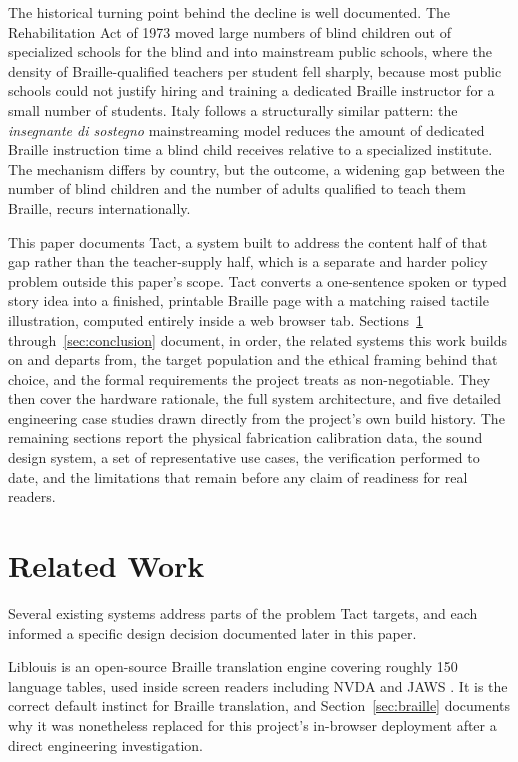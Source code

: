 \documentclass[conference]{IEEEtran}
\begin{document}
The historical turning point behind the decline is well documented. The Rehabilitation Act of 1973 moved large numbers of blind children out of specialized schools for the blind and into mainstream public schools, where the density of Braille-qualified teachers per student fell sharply, because most public schools could not justify hiring and training a dedicated Braille instructor for a small number of students. Italy follows a structurally similar pattern: the \emph{insegnante di sostegno} mainstreaming model reduces the amount of dedicated Braille instruction time a blind child receives relative to a specialized institute. The mechanism differs by country, but the outcome, a widening gap between the number of blind children and the number of adults qualified to teach them Braille, recurs internationally.

This paper documents Tact, a system built to address the content half of that gap rather than the teacher-supply half, which is a separate and harder policy problem outside this paper's scope. Tact converts a one-sentence spoken or typed story idea into a finished, printable Braille page with a matching raised tactile illustration, computed entirely inside a web browser tab. Sections~\ref{sec:related} through~\ref{sec:conclusion} document, in order, the related systems this work builds on and departs from, the target population and the ethical framing behind that choice, and the formal requirements the project treats as non-negotiable. They then cover the hardware rationale, the full system architecture, and five detailed engineering case studies drawn directly from the project's own build history. The remaining sections report the physical fabrication calibration data, the sound design system, a set of representative use cases, the verification performed to date, and the limitations that remain before any claim of readiness for real readers.

\section{Related Work}\label{sec:related}

Several existing systems address parts of the problem Tact targets, and each informed a specific design decision documented later in this paper.

Liblouis is an open-source Braille translation engine covering roughly 150 language tables, used inside screen readers including NVDA and JAWS \cite{liblouis}. It is the correct default instinct for Braille translation, and Section~\ref{sec:braille} documents why it was nonetheless replaced for this project's in-browser deployment after a direct engineering investigation.
\end{document}

